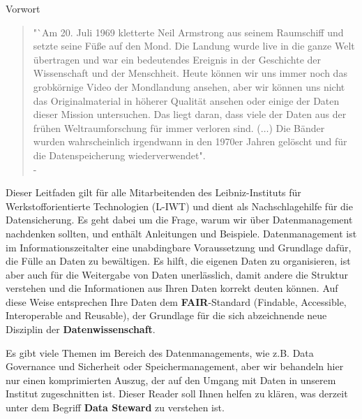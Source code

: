 \thispagestyle{empty}
\begin{center}
  \large\headerfont{}\textcolor{iwtdark}{Vorwort}
\end{center}

\begin{quote}
  "`Am 20. Juli 1969 kletterte Neil Armstrong aus seinem Raumschiff und setzte
  seine Füße auf den Mond. Die Landung wurde live in die ganze Welt übertragen
  und war ein bedeutendes Ereignis in der Geschichte der Wissenschaft und der
  Menschheit. Heute können wir uns immer noch das grobkörnige Video der
  Mondlandung ansehen, aber wir können uns nicht das Originalmaterial in höherer
  Qualität ansehen oder einige der Daten dieser Mission untersuchen. Das
  liegt daran, dass viele der Daten aus der frühen Weltraumforschung für immer
  verloren sind. ($\ldots$) Die Bänder wurden wahrscheinlich irgendwann in den 1970er
  Jahren gelöscht und für die Datenspeicherung wiederverwendet". \\
  \null\hfill - \citeauthor{briney2015}\cite{briney2015}
\end{quote}

\noindent Dieser Leitfaden gilt für alle Mitarbeitenden des Leibniz-Instituts für Werkstofforientierte Technologien (L-IWT) und
dient als Nachschlagehilfe für die Datensicherung. Es geht dabei um die Frage,
warum wir über Datenmanagement nachdenken sollten, und enthält Anleitungen und
Beispiele. Datenmanagement ist im Informationszeitalter eine unabdingbare
Voraussetzung und Grundlage dafür, die Fülle an Daten zu bewältigen. Es hilft,
die eigenen Daten zu organisieren, ist aber auch für die Weitergabe von Daten
unerlässlich, damit andere die Struktur verstehen und die Informationen aus
Ihren Daten korrekt deuten können. Auf diese Weise entsprechen Ihre Daten dem
\textbf{FAIR}-Standard (Findable, Accessible, Interoperable and Reusable), der
Grundlage für die sich abzeichnende neue Disziplin der
\textbf{Datenwissenschaft}.

Es gibt viele Themen im Bereich des Datenmanagements, wie z.B. Data Governance
und Sicherheit oder Speichermanagement, aber wir behandeln hier nur einen
komprimierten Auszug, der auf den Umgang mit Daten in unserem Institut
zugeschnitten ist. Dieser Reader soll Ihnen helfen zu klären, was derzeit unter dem Begriff \textbf{Data Steward} zu verstehen ist.
